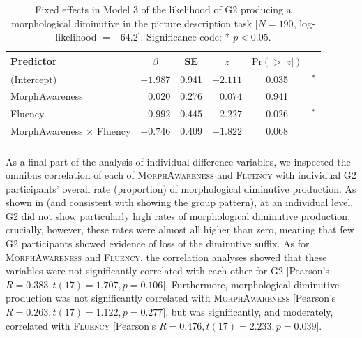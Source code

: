 \documentclass[output=paper,colorlinks,citecolor=brown]{langscibook}
\begin{document}
\begin{table}
\caption{Fixed effects in Model 3 of the likelihood of G2 producing a morphological diminutive in the picture description task [$N=190$, log-likelihood $=-64.2$]. Significance code: * $p<0.05$.}
\label{tab:modelPDT}
\begin{tabular}{lrrrc@{\,}l}
\lsptoprule
Predictor & \multicolumn{1}{c}{$\beta$} & \multicolumn{1}{c}{SE} & \multicolumn{1}{c}{$z$} & \multicolumn{1}{c}{$\text{Pr}(>|z|)$} & \\
\midrule
(Intercept)                     & $-1.987$  & 0.941 & $-2.111$ & 0.035 & $^{*}$ \\ 
MorphAwareness                  & $0.020 $  & 0.276 & $0.074 $ & 0.941 & \\
Fluency                         & $0.992 $  & 0.445 & $2.227 $ & 0.026 & $^{*}$ \\
MorphAwareness $\times$ Fluency & $-0.746$  & 0.409 & $-1.822$ & 0.068 & \\
\lspbottomrule
\end{tabular}

\end{table}

As a final part of the analysis of individual-difference variables, we inspected the omnibus correlation of each of \textsc{MorphAwareness} and \textsc{Fluency} with individual G2 participants' overall rate (proportion) of morphological diminutive production. As shown in  (and consistent with  showing the group pattern), at an individual level, G2 did not show particularly high rates of morphological diminutive production; crucially, however, these rates were almost all higher than zero, meaning that few G2 participants showed evidence of loss of the diminutive suffix. As for \textsc{MorphAwareness} and \textsc{Fluency}, the correlation analyses showed that these variables were not significantly correlated with each other for G2 [Pearson's $R=0.383, t(17)=1.707, p=0.106$]. Furthermore, morphological diminutive production was not significantly correlated with \textsc{MorphAwareness} [Pearson's $R=0.263, t(17)=1.122, p=0.277$], but was significantly, and moderately, correlated with \textsc{Fluency} [Pearson's $R=0.476, t(17)=2.233, p=0.039$].
\end{document}
